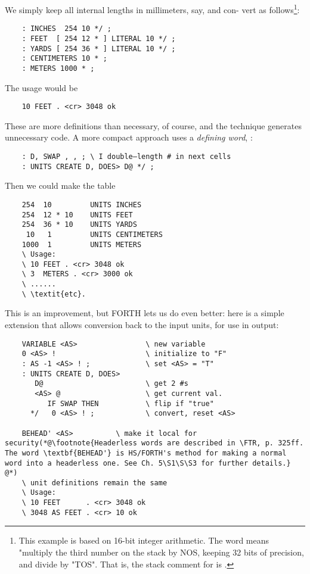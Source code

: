We simply keep all internal lengths in millimeters, say, and con-
vert as follows\footnote{This example is based on 16-bit integer arithmetic. The word \regc{*/} means "multiply the third number on the stack by NOS, keeping 32 bits of precision, and divide by "TOS". That is, the stack comment for \regc{*/} is .}:

\begin{lstlisting}
    : INCHES  254 10 */ ;
    : FEET  [ 254 12 * ] LITERAL 10 */ ;
    : YARDS [ 254 36 * ] LITERAL 10 */ ;
    : CENTIMETERS 10 * ;
    : METERS 1000 * ;
\end{lstlisting}

The usage would be
\begin{lstlisting}
    10 FEET . <cr> 3048 ok
\end{lstlisting}

These are more definitions than necessary, of course, and the technique generates unnecessary code. A more compact approach uses a \textit{defining word}, :

\begin{lstlisting}
    : D, SWAP , , ; \ I double—length # in next cells
    : UNITS CREATE D, DOES> D@ */ ;
\end{lstlisting}

Then we could make the table
\begin{lstlisting}
    254  10         UNITS INCHES
    254  12 * 10    UNITS FEET
    254  36 * 10    UNITS YARDS
     10   1         UNITS CENTIMETERS
    1000  1         UNITS METERS
    \ Usage:
    \ 10 FEET . <cr> 3048 ok
    \ 3  METERS . <cr> 3000 ok
    \ ......
    \ \textit{etc}.
\end{lstlisting}

This is an improvement, but FORTH lets us do even better: here is a simple extension that allows conversion back to the input units, for use in output:

\begin{lstlisting}
    VARIABLE <AS>                \ new variable
    0 <AS> !                     \ initialize to "F"
    : AS -1 <AS> ! ;             \ set <AS> = "T"
    : UNITS CREATE D, DOES>
       D@                        \ get 2 #s
       <AS> @                    \ get current val.
          IF SWAP THEN           \ flip if "true"
      */   0 <AS> ! ;            \ convert, reset <AS>

    BEHEAD' <AS>          \ make it local for security(*@\footnote{Headerless words are described in \FTR, p. 325ff. The word \textbf{BEHEAD'} is HS/FORTH's method for making a normal word into a headerless one. See Ch. 5\S1\S\S3 for further details.} @*)
    \ unit definitions remain the same
    \ Usage:
    \ 10 FEET      . <cr> 3048 ok
    \ 3048 AS FEET . <cr> 10 ok
\end{lstlisting}

